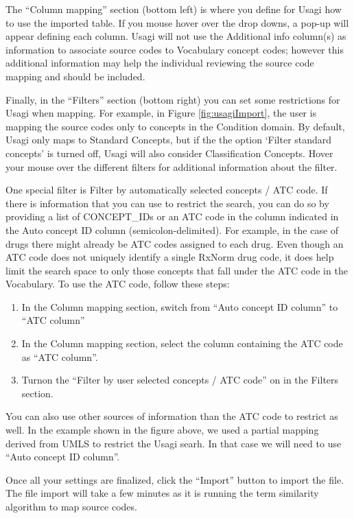 \documentclass[11pt]{book}
\providecommand{\tightlist}{%
  \setlength{\itemsep}{0pt}\setlength{\parskip}{0pt}}
\theoremstyle{definition}
\theoremstyle{definition}
\theoremstyle{definition}
\theoremstyle{remark}
\begin{document}
The ``Column mapping'' section (bottom left) is where you define for Usagi how to use the imported table. If you mouse hover over the drop downs, a pop-up will appear defining each column. Usagi will not use the Additional info column(s) as information to associate source codes to Vocabulary concept codes; however this additional information may help the individual reviewing the source code mapping and should be included.

Finally, in the ``Filters'' section (bottom right) you can set some restrictions for Usagi when mapping. For example, in Figure \ref{fig:usagiImport}, the user is mapping the source codes only to concepts in the Condition domain. By default, Usagi only maps to Standard Concepts, but if the the option `Filter standard concepts' is turned off, Usagi will also consider Classification Concepts. Hover your mouse over the different filters for additional information about the filter.

One special filter is Filter by automatically selected concepts / ATC code. If there is information that you can use to restrict the search, you can do so by providing a list of CONCEPT\_IDs or an ATC code in the column indicated in the Auto concept ID column (semicolon-delimited). For example, in the case of drugs there might already be ATC codes assigned to each drug. Even though an ATC code does not uniquely identify a single RxNorm drug code, it does help limit the search space to only those concepts that fall under the ATC code in the Vocabulary. To use the ATC code, follow these steps:

\begin{enumerate}
\def\labelenumi{\arabic{enumi}.}
\tightlist
\item
  In the Column mapping section, switch from ``Auto concept ID column'' to ``ATC column''
\item
  In the Column mapping section, select the column containing the ATC code as ``ATC column''.
\item
  Turnon the ``Filter by user selected concepts / ATC code'' on in the Filters section.
\end{enumerate}

You can also use other sources of information than the ATC code to restrict as well. In the example shown in the figure above, we used a partial mapping derived from UMLS to restrict the Usagi searh. In that case we will need to use ``Auto concept ID column''.

Once all your settings are finalized, click the ``Import'' button to import the file. The file import will take a few minutes as it is running the term similarity algorithm to map source codes.
\end{document}
